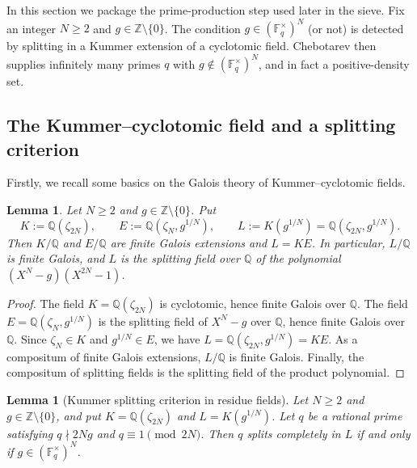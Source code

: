 \documentclass[11pt,letterpaper]{amsart}
\newcommand{\Z}{\mathbb{Z}}
\newcommand{\Q}{\mathbb{Q}}
\newcommand{\F}{\mathbb{F}}
\theoremstyle{plain}
\newtheorem{lemma}[theorem]{Lemma}
\theoremstyle{definition}
\theoremstyle{remark}
\theoremstyle{plain}
\begin{document}
In this section we package the prime-production step used later in the sieve. Fix an integer $N\ge 2$ and $g\in\Z\setminus\{0\}$.  The condition
$g\in(\F_q^\times)^N$ (or not) is detected by splitting in a Kummer extension of a
cyclotomic field.  Chebotarev then supplies infinitely many primes $q$ with
$g\notin(\F_q^\times)^N$, and in fact a positive-density set.

\subsection{The Kummer--cyclotomic field and a splitting criterion}
Firstly, we recall some basics on the Galois theory of Kummer--cyclotomic fields.

\begin{lemma}
\label{lem:kummer-galois}
Let $N\ge 2$ and $g\in\Z\setminus\{0\}$. Put
\[
K:=\Q(\zeta_{2N}),\qquad E:=\Q(\zeta_{N},g^{1/N}),\qquad L:=K(g^{1/N})=\Q(\zeta_{2N},g^{1/N}).
\]
Then $K/\Q$ and $E/\Q$ are finite Galois extensions and $L=KE$.
In particular, $L/\Q$ is finite Galois, and $L$ is the splitting field over $\Q$
of the polynomial $(X^N-g)(X^{2N}-1)$.
\end{lemma}

\begin{proof}
The field $K=\Q(\zeta_{2N})$ is cyclotomic, hence finite Galois over $\Q$.
The field $E=\Q(\zeta_N,g^{1/N})$ is the splitting field of $X^N-g$ over $\Q$, hence finite Galois over $\Q$.
Since $\zeta_N\in K$ and $g^{1/N}\in E$, we have $L=\Q(\zeta_{2N},g^{1/N})=KE$.
As a compositum of finite Galois extensions, $L/\Q$ is finite Galois.
Finally, the compositum of splitting fields is the splitting field of the product polynomial.
\end{proof}

\begin{lemma}[Kummer splitting criterion in residue fields]
\label{lem:kummer-splitting-general}
Let $N\ge 2$ and $g\in\Z\setminus\{0\}$, and put $K=\Q(\zeta_{2N})$ and $L=K(g^{1/N})$.
Let $q$ be a rational prime satisfying $q\nmid 2Ng$ and $q\equiv 1\pmod{2N}$.
Then $q$ splits completely in $L$ if and only if $g\in(\F_q^\times)^N$.
\end{lemma}
\end{document}
